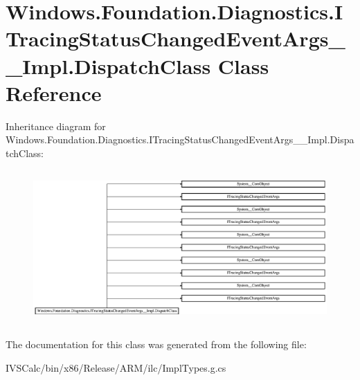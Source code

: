 \hypertarget{class_windows_1_1_foundation_1_1_diagnostics_1_1_i_tracing_status_changed_event_args_____impl_1_1_dispatch_class}{}\section{Windows.\+Foundation.\+Diagnostics.\+I\+Tracing\+Status\+Changed\+Event\+Args\+\_\+\+\_\+\+Impl.\+Dispatch\+Class Class Reference}
\label{class_windows_1_1_foundation_1_1_diagnostics_1_1_i_tracing_status_changed_event_args_____impl_1_1_dispatch_class}
Inheritance diagram for Windows.\+Foundation.\+Diagnostics.\+I\+Tracing\+Status\+Changed\+Event\+Args\+\_\+\+\_\+\+Impl.\+Dispatch\+Class\+:\begin{figure}[H]
\begin{center}
\leavevmode
\includegraphics[height=5.923077cm]{class_windows_1_1_foundation_1_1_diagnostics_1_1_i_tracing_status_changed_event_args_____impl_1_1_dispatch_class}
\end{center}
\end{figure}


The documentation for this class was generated from the following file\+:\begin{DoxyCompactItemize}
\item 
I\+V\+S\+Calc/bin/x86/\+Release/\+A\+R\+M/ilc/Impl\+Types.\+g.\+cs\end{DoxyCompactItemize}
